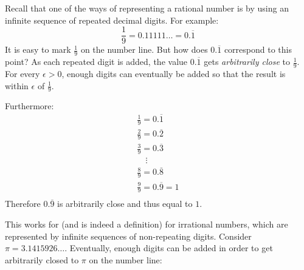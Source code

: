 \documentclass[letterpaper,12pt,fleqn]{article}
\newcommand{\e}{\epsilon}
\begin{document}
\begin{example}
  Recall that one of the ways of representing a rational number is by using an infinite sequence of repeated
  decimal digits.  For example:
  \[\frac{1}{9}=0.11111\ldots=0.\overline{1}\]
  It is easy to mark \(\frac{1}{9}\) on the number line.  But how does \(0.\overline{1}\) correspond to this point?
  As each repeated digit is added, the value \(0.\overline{1}\) gets \emph{arbitrarily close} to \(\frac{1}{9}\).
  For every \(\e>0\), enough digits can eventually be added so that the result is within \(\e\) of \(\frac{1}{9}\).

  \bigskip

  \begin{center}
  \end{center}

  Furthermore:
  \begin{gather*}
    \frac{1}{9}=0.\overline{1} \\
    \frac{2}{9}=0.\overline{2} \\
    \frac{3}{9}=0.\overline{3} \\
    \quad\vdots \\
    \frac{8}{9}=0.\overline{8} \\
    \frac{9}{9}=0.\overline{9}=1 \\
  \end{gather*}
  Therefore \(0.\overline{9}\) is arbitrarily close and thus equal to \(1\).
\end{example}

\begin{example}
  This works for (and is indeed a definition) for irrational numbers, which are represented by infinite sequences
  of non-repeating digits.  Consider \(\pi=3.1415926\ldots\).  Eventually, enough digits can be added in order to
  get arbitrarily closed to \(\pi\) on the number line:

  \bigskip

  \begin{center}
  \end{center}
\end{example}
\end{document}
